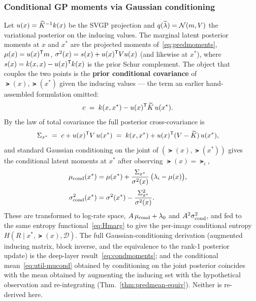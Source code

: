 \subsubsection{Conditional GP moments via Gaussian conditioning}
\label{subsubsec:condmoments}

Let $u(x)=\widetilde{K}^{-1}k(x)$ be the SVGP projection and $q(\widetilde{\lambda})=\mathcal{N}(m,V)$
the variational posterior on the inducing values. The marginal latent posterior
moments at $x$ and $x^{*}$ are the projected moments of~\eqref{eq:predmoments},
$\mu(x)=u(x)^{\mathsf{T}}m$, $\sigma^{2}(x)=s(x)+u(x)^{\mathsf{T}}Vu(x)$
(and likewise at $x^{*}$), where $s(x)=k(x,x)-u(x)^{\mathsf{T}}k(x)$ is
the prior Schur complement. The object that couples the two points is the
\textbf{prior conditional covariance} of $\lat(x),\lat(x^{*})$ given the inducing
values --- the term an earlier hand-assembled formulation omitted:
%
\begin{equation}
  c \;=\; k(x,x^{*}) - u(x)^{\mathsf{T}}\widetilde{K}\,u(x^{*}) .
  \label{eq:util-ccond}
\end{equation}
%
By the law of total covariance the full posterior cross-covariance is
%
\begin{equation}
  \Sigma_{x^{*}} \;=\; c + u(x)^{\mathsf{T}}V\,u(x^{*})
             \;=\; k(x,x^{*}) + u(x)^{\mathsf{T}}(V-\widetilde{K})\,u(x^{*}) ,
  \label{eq:util-crosscov}
\end{equation}
%
and standard Gaussian conditioning on the joint of
$(\lat(x),\lat(x^{*}))$ gives the conditional latent moments at $x^{*}$ after
observing $\lat(x)=\lat_i$,
%
\begin{align}
  \mu_{\mathrm{cond}}(x^{*})     &= \mu(x^{*}) + \frac{\Sigma_{x^{*}}}{\sigma^{2}(x)}\,\big(\lambda_i-\mu(x)\big),
    \label{eq:util-mucond}\\[2pt]
  \sigma^{2}_{\mathrm{cond}}(x^{*}) &= \sigma^{2}(x^{*}) - \frac{\Sigma_{x^{*}}^{2}}{\sigma^{2}(x)} .
    \label{eq:util-sigcond}
\end{align}
%
These are transformed to log-rate space, $A\,\mu_{\mathrm{cond}}+\lambda_{0}$ and
$A^{2}\sigma^{2}_{\mathrm{cond}}$, and fed to the same entropy
functional~\eqref{eq:Hmarg} to give the per-image conditional entropy
$H(R\mid x^{*},\lat(x),\mathcal D)$. The full Gaussian-conditioning derivation
(augmented inducing matrix, block inverse, and the equivalence to the rank-1
posterior update) is the deep-layer result~\eqref{eq:condmoments}; and the
conditional mean~\eqref{eq:util-mucond} obtained by conditioning on the joint
posterior coincides with the mean obtained by augmenting the inducing set with the
hypothetical observation and re-integrating (Thm.~\ref{thm:predmean-equiv}). Neither
is re-derived here.

